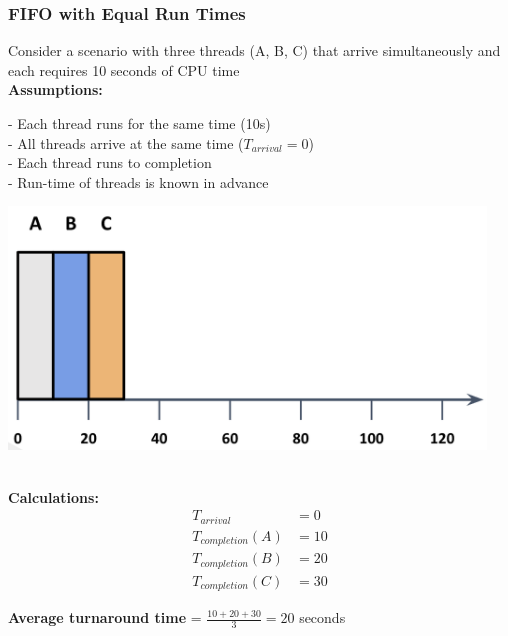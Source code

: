 \documentclass[../../compsys.tex]{subfiles}
\begin{document}
\subsubsection{FIFO with Equal Run Times}
Consider a scenario with three threads (A, B, C) that arrive simultaneously and each requires 10 seconds of CPU time \\[5px]
\textbf{Assumptions:}\\[5px]
\begin{minipage}[htp]{0.5\textwidth}
 - Each thread runs for the same time (10s) \\[5px]
 - All threads arrive at the same time ($T_{arrival} = 0$) \\[5px]
 - Each thread runs to completion \\[5px]
 - Run-time of threads is known in advance \\[5px]
\end{minipage}
\hfill
\begin{minipage}[htp]{0.5\textwidth}
    \centering
    \includegraphics[width=0.95\textwidth]{images/fifo.png}
\end{minipage}\\[5px]
\textbf{Calculations:}
\begin{align*}
    T_{arrival} &= 0 \\
    T_{completion}(A) &= 10 \\
    T_{completion}(B) &= 20 \\
    T_{completion}(C) &= 30
\end{align*}

\textbf{Average turnaround time} = $\frac{10 + 20 + 30}{3} = 20$ seconds
\end{document}
